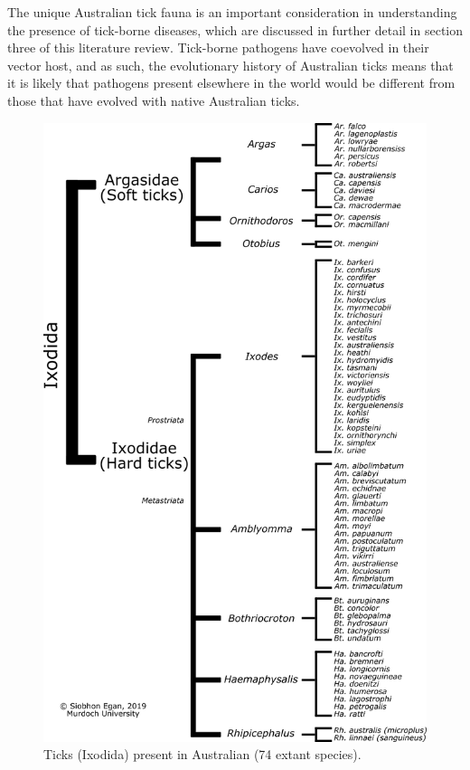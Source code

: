 \documentclass[a4paper, nobind]{templates/ociamthesis}
\begin{document}
The unique Australian tick fauna is an important consideration in understanding the presence of tick-borne diseases, which are discussed in further detail in section three of this literature review. Tick-borne pathogens have coevolved in their vector host, and as such, the evolutionary history of Australian ticks means that it is likely that pathogens present elsewhere in the world would be different from those that have evolved with native Australian ticks.

\begin{figure}
\includegraphics[width=0.95\linewidth]{figures/ms-figs/Ch1-ausixod} \caption[Tick species (Ixodida) of Australian.]{Ticks (Ixodida) present in Australian (74 extant species).}\label{fig:F1ausixod}
\end{figure}
\end{document}
